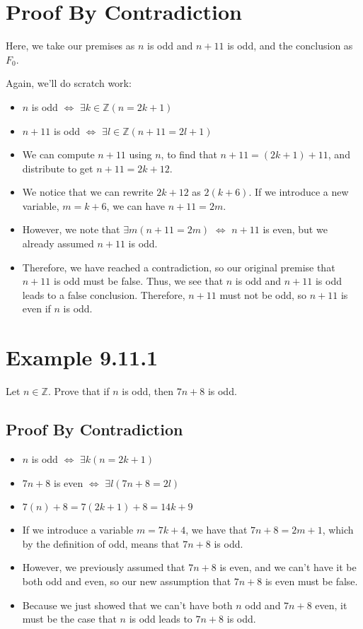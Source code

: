 \documentclass{article}
\begin{document}
\section*{Proof By Contradiction}

Here, we take our premises as $n$ is odd and $n+11$ is odd, and the
conclusion as $F_0$.

Again, we'll do scratch work:

\begin{itemize}
\item $n$ is odd $\Leftrightarrow$ $\exists{}k\in\mathbb{Z}(n=2k+1)$
\item $n+11$ is odd $\Leftrightarrow$ $\exists{}l\in\mathbb{Z}(n+11=2l+1)$
\item We can compute $n+11$ using $n$, to find that $n+11=(2k+1)+11$,
  and distribute to get $n+11=2k+12$.
\item We notice that we can rewrite $2k+12$ as $2(k+6)$. If we
  introduce a new variable, $m=k+6$, we can have $n+11=2m$.
\item However, we note that $\exists{}m(n+11=2m)$ $\Leftrightarrow$
  $n+11$ is even, but we already assumed $n+11$ is odd.
\item Therefore, we have reached a contradiction, so our original
  premise that $n+11$ is odd must be false. Thus, we see that $n$ is
  odd and $n+11$ is odd leads to a false conclusion. Therefore, $n+11$
  must not be odd, so $n+11$ is even if $n$ is odd.
\end{itemize}

\section*{Example 9.11.1}

Let $n\in\mathbb{Z}$. Prove that if $n$ is odd, then $7n+8$ is odd.

\subsection*{Proof By Contradiction}

\begin{itemize}
\item $n$ is odd $\Leftrightarrow$ $\exists{}k(n=2k+1)$
\item $7n+8$ is even $\Leftrightarrow$ $\exists{}l(7n+8=2l)$
\item $7(n)+8=7(2k+1)+8=14k+9$
\item If we introduce a variable $m=7k+4$, we have that $7n+8=2m+1$,
  which by the definition of odd, means that $7n+8$ is odd.
\item However, we previously assumed that $7n+8$ is even, and we can't
  have it be both odd and even, so our new assumption that $7n+8$ is
  even must be false.
\item Because we just showed that we can't have both $n$ odd and
  $7n+8$ even, it must be the case that $n$ is odd leads to $7n+8$ is
  odd.
\end{itemize}
\end{document}

